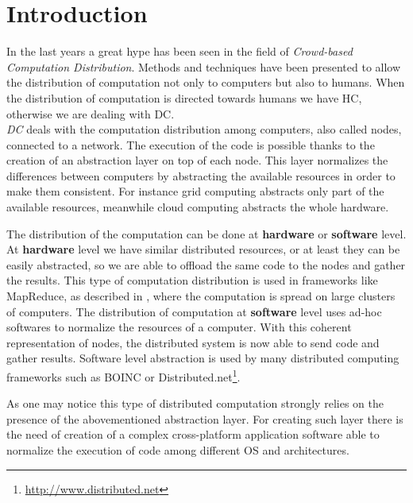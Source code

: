 \cleardoublepage
\chapter{Introduction}
\label{intro}

In the last years a great hype has been seen in the field of \emph{Crowd-based
Computation Distribution}. Methods and techniques have been presented to allow the
distribution of computation not only to computers but also to humans. When the
distribution of computation is directed towards humans we have \ac{HC},
otherwise we are dealing with \ac{DC}.\\


\emph{\acl{DC}} deals with the computation distribution among computers, also
called nodes, connected to a network. The execution of the code is possible thanks
to the creation of an abstraction layer on top of each node. This layer normalizes
the differences between computers by abstracting the available resources in order
to make them consistent. For instance grid computing abstracts only part of the
available resources, meanwhile cloud computing abstracts the whole hardware.

The distribution of the computation can be done at \textbf{hardware} or
\textbf{software} level.
At \textbf{hardware} level we have similar distributed resources, or at least
they can be easily abstracted, so we are able to offload the same code to the
nodes and gather the results. This type of computation distribution is used in
frameworks like MapReduce, as described in \cite{dean2008mapreduce}, where the
computation is spread on large clusters of computers.
The distribution of computation at \textbf{software} level uses ad-hoc softwares
to normalize the resources of a computer. With this coherent representation of
nodes, the distributed system is now able to send code and gather results.
Software level abstraction is used by many distributed computing frameworks such
as \ac{BOINC} or Distributed.net\footnote{\url{http://www.distributed.net}}.

As one may notice this type of distributed computation strongly relies on the
presence of the abovementioned abstraction layer. For creating such layer there is
the need of creation of a complex cross-platform application software able to normalize
the execution of code among different OS and architectures.\\



